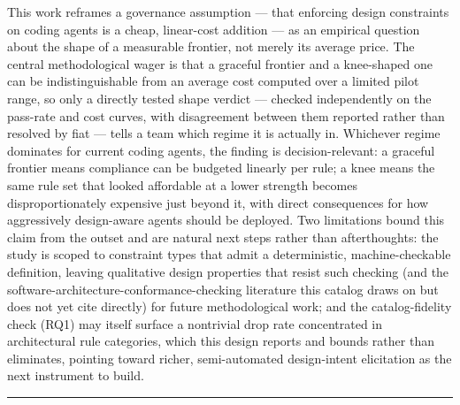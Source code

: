 \documentclass[11pt]{article}
\begin{document}
This work reframes a governance assumption --- that enforcing design constraints on coding agents is a cheap, linear-cost addition --- as an empirical question about the shape of a measurable frontier, not merely its average price. The central methodological wager is that a graceful frontier and a knee-shaped one can be indistinguishable from an average cost computed over a limited pilot range, so only a directly tested shape verdict --- checked independently on the pass-rate and cost curves, with disagreement between them reported rather than resolved by fiat --- tells a team which regime it is actually in. Whichever regime dominates for current coding agents, the finding is decision-relevant: a graceful frontier means compliance can be budgeted linearly per rule; a knee means the same rule set that looked affordable at a lower strength becomes disproportionately expensive just beyond it, with direct consequences for how aggressively design-aware agents should be deployed. Two limitations bound this claim from the outset and are natural next steps rather than afterthoughts: the study is scoped to constraint types that admit a deterministic, machine-checkable definition, leaving qualitative design properties that resist such checking (and the software-architecture-conformance-checking literature this catalog draws on but does not yet cite directly) for future methodological work; and the catalog-fidelity check (RQ1) may itself surface a nontrivial drop rate concentrated in architectural rule categories, which this design reports and bounds rather than eliminates, pointing toward richer, semi-automated design-intent elicitation as the next instrument to build.

\vspace{1em}
\hrule
\vspace{1em}
\end{document}

